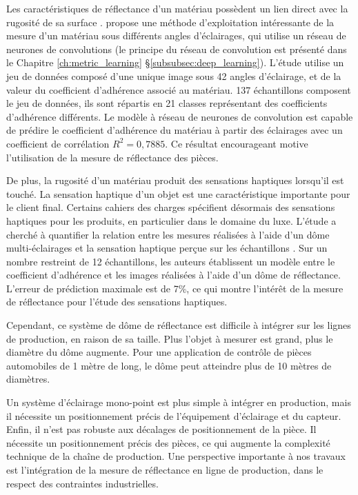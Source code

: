 Les caractéristiques de réflectance d'un matériau possèdent un lien direct avec la rugosité de sa surface \cite{torrance_theory_1967}.
\citeauthor{zhang_friction_2016} \cite{zhang_friction_2016} propose une méthode d'exploitation intéressante de la mesure d'un matériau sous différents angles d'éclairages, qui utilise un réseau de neurones de convolutions  (le principe du réseau de convolution est présenté dans le Chapitre \ref{ch:metric_learning} §\ref{subsubsec:deep_learning}).
L'étude utilise un jeu de données composé d'une unique image sous 42 angles d'éclairage, et de la valeur du coefficient d'adhérence associé au matériau.
137 échantillons composent le jeu de données, ils sont répartis en 21 classes représentant des coefficients d'adhérence différents.
Le modèle à réseau de neurones de convolution est capable de prédire le coefficient d'adhérence du matériau à partir des éclairages avec un coefficient de corrélation $R^2 = 0,7885$.
Ce résultat encourageant motive l'utilisation de la mesure de réflectance des pièces.

De plus, la rugosité d'un matériau produit des sensations haptiques lorsqu'il est touché.
La sensation haptique d'un objet est une caractéristique importante pour le client final.
Certains cahiers des charges spécifient désormais des sensations haptiques pour les produits, en particulier dans le domaine du luxe.
L'étude  a cherché à quantifier la relation entre les mesures réalisées à l'aide d'un dôme multi-éclairages et la sensation haptique perçue sur les échantillons \cite{lacombe_see_2017}.
Sur un nombre restreint de 12 échantillons, les auteurs établissent un modèle entre le coefficient d'adhérence et les images réalisées à l'aide d'un dôme de réflectance.
L’erreur de prédiction maximale est de 7\%, ce qui montre l'intérêt de la mesure de réflectance pour l'étude des sensations haptiques. 

Cependant, ce système de dôme de réflectance est difficile à intégrer sur les lignes de production, en raison de sa taille.
Plus l'objet à mesurer est grand, plus le diamètre du dôme augmente.
Pour une application de contrôle de pièces automobiles de 1 mètre de long, le dôme peut atteindre plus de 10 mètres de diamètres.

Un système d'éclairage mono-point est plus simple à intégrer en production, mais il nécessite un positionnement précis de l'équipement d'éclairage et du capteur.
Enfin, il n’est pas robuste aux décalages de positionnement de la pièce.
Il nécessite un positionnement précis des pièces, ce qui augmente la complexité technique de la chaîne de production.
Une perspective importante à nos travaux est l'intégration de la mesure de réflectance en ligne de production, dans le respect des contraintes industrielles.

